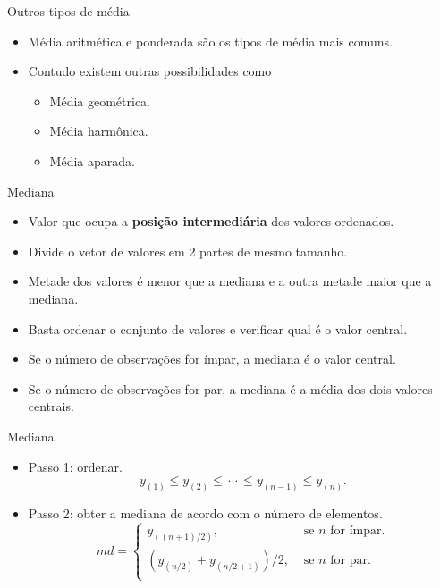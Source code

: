 \documentclass[
  ignorenonframetext,
  serif,
  professionalfont,
  usenames,
  dvipsnames,
  aspectratio = 169]{beamer}
\providecommand{\tightlist}{%
  \setlength{\itemsep}{0pt}\setlength{\parskip}{0pt}}
\renewcommand{\tightlist}{%
  \setlength{\itemsep}{0\baselineskip}
  \setlength{\parskip}{0.25\baselineskip}
}
\begin{document}
\begin{frame}{Outros tipos de média}
\protect\hypertarget{outros-tipos-de-muxe9dia}{}
\begin{itemize}
\tightlist
\item
  Média aritmética e ponderada são os tipos de média mais comuns.
\item
  Contudo existem outras possibilidades como

  \begin{itemize}
  \tightlist
  \item
    Média geométrica.
  \item
    Média harmônica.
  \item
    Média aparada.
  \end{itemize}
\end{itemize}
\end{frame}

\begin{frame}{Mediana}
\protect\hypertarget{mediana}{}
\begin{itemize}
\tightlist
\item
  Valor que ocupa a \textbf{posição intermediária} dos valores
  ordenados.
\item
  Divide o vetor de valores em 2 partes de mesmo tamanho.
\item
  Metade dos valores é menor que a mediana e a outra metade maior que a
  mediana.
\item
  Basta ordenar o conjunto de valores e verificar qual é o valor
  central.
\item
  Se o número de observações for ímpar, a mediana é o valor central.
\item
  Se o número de observações for par, a mediana é a média dos dois
  valores centrais.
\end{itemize}
\end{frame}

\begin{frame}{Mediana}
\protect\hypertarget{mediana-1}{}
\begin{itemize}
\item
  Passo 1: ordenar. \[
  y_{(1)} \leq y_{(2)} \leq \, \cdots \, \leq y_{(n-1)} \leq y_{(n)}.
  \]
\item
  Passo 2: obter a mediana de acordo com o número de elementos. \[
  md = \begin{cases}
          y_{((n + 1)/2)}, & \text{ se } n \text{ for \'impar}.\\
          (y_{(n/2)} + y_{(n/2 + 1)})/2, & \text{ se } n \text{ for par}.\\
          \end{cases}
  \]
\end{itemize}
\end{frame}
\end{document}

